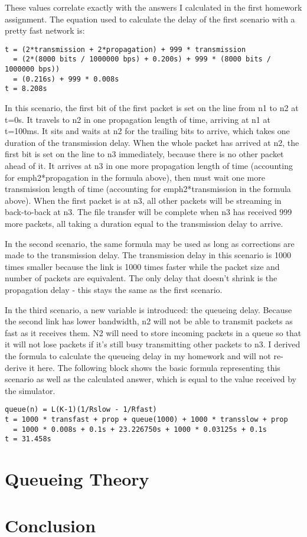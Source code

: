 \documentclass[11pt]{article}
\begin{document}
These values correlate exactly with the answers I calculated in the first homework assignment. The equation used to calculate the delay of the first scenario with a pretty fast network is:

\begin{lstlisting}
t = (2*transmission + 2*propagation) + 999 * transmission
  = (2*(8000 bits / 1000000 bps) + 0.200s) + 999 * (8000 bits / 1000000 bps))
  = (0.216s) + 999 * 0.008s
t = 8.208s
\end{lstlisting}

In this scenario, the first bit of the first packet is set on the line from n1 to n2 at t=0s. It travels to n2 in one propagation length of time, arriving at n1 at t=100ms. It sits and waits at n2 for the trailing bits to arrive, which takes one duration of the transmission delay. When the whole packet has arrived at n2, the first bit is set on the line to n3 immediately, because there is no other packet ahead of it. It arrives at n3 in one more propagation length of time (accounting for emph{2*propagation} in the formula above), then must wait one more transmission length of time (accounting for emph{2*transmission} in the formula above). When the first packet is at n3, all other packets will be streaming in back-to-back at n3. The file transfer will be complete when n3 has received 999 more packets, all taking a duration equal to the transmission delay to arrive.

In the second scenario, the same formula may be used as long as corrections are made to the transmission delay. The transmission delay in this scenario is 1000 times smaller because the link is 1000 times faster while the packet size and number of packets are equivalent. The only delay that doesn't shrink is the propagation delay - this stays the same as the first scenario.

In the third scenario, a new variable is introduced: the queueing delay. Because the second link has lower bandwidth, n2 will not be able to transmit packets as fast as it receives them. N2 will need to store incoming packets in a queue so that it will not lose packets if it's still busy transmitting other packets to n3. I derived the formula to calculate the queueing delay in my homework and will not re-derive it here. The following block shows the basic formula representing this scenario as well as the calculated answer, which is equal to the value received by the simulator.

\begin{lstlisting}
queue(n) = L(K-1)(1/Rslow - 1/Rfast)
t = 1000 * transfast + prop + queue(1000) + 1000 * transslow + prop
  = 1000 * 0.008s + 0.1s + 23.226750s + 1000 * 0.03125s + 0.1s
t = 31.458s
\end{lstlisting}

\section{Queueing Theory}

\section{Conclusion}
\end{document}
